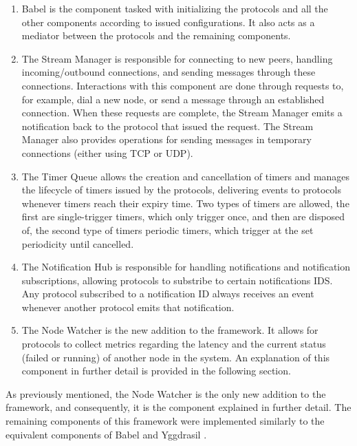 \begin{enumerate}

    \item Babel is the component tasked with initializing the protocols and all the other components according to issued configurations. It also acts as a mediator between the protocols and the remaining components.

    \item The Stream Manager is responsible for connecting to new peers, handling incoming/outbound connections, and sending messages through these connections. Interactions with this component are done through requests to, for example, dial a new node, or send a message through an established connection. When these requests are complete, the Stream Manager emits a notification back to the protocol that issued the request. The Stream Manager also provides operations for sending messages in temporary connections (either using TCP or UDP).

    \item The Timer Queue allows the creation and cancellation of timers and manages the lifecycle of timers issued by the protocols, delivering events to protocols whenever timers reach their expiry time. Two types of timers are allowed, the first are single-trigger timers, which only trigger once, and then are disposed of, the second type of timers periodic timers, which trigger at the set periodicity until cancelled.

    \item The Notification Hub is responsible for handling notifications and notification subscriptions, allowing protocols to substribe to certain notifications IDS. Any protocol subscribed to a notification ID always receives an event whenever another protocol emits that notification.

    \item The Node Watcher is the new addition to the framework. It allows for protocols to collect metrics regarding the latency and the current status (failed or running) of another node in the system. An explanation of this component in further detail is provided in the following section.

\end{enumerate}

As previously mentioned, the  Node Watcher is the only new addition to the framework, and consequently, it is the component explained in further detail. The remaining components of this framework were implemented similarly to the equivalent components of Babel \cite{babel} and Yggdrasil \cite{akosThesis}.

